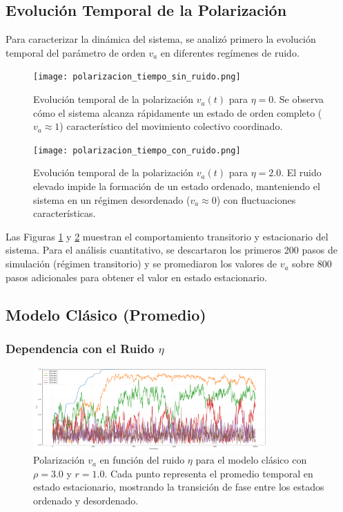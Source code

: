\documentclass{article}
\begin{document}
\subsection{Evolución Temporal de la Polarización}
Para caracterizar la dinámica del sistema, se analizó primero la evolución temporal del parámetro de orden $v_a$ en diferentes regímenes de ruido.

\begin{figure}[H]
\centering
\texttt{[image: polarizacion\_tiempo\_sin\_ruido.png]}
\caption{Evolución temporal de la polarización $v_a(t)$ para $\eta = 0$. Se observa cómo el sistema alcanza rápidamente un estado de orden completo ($v_a \approx 1$) característico del movimiento colectivo coordinado.}
\label{fig:tiempo_sin_ruido}
\end{figure}

\begin{figure}[H]
\centering
\texttt{[image: polarizacion\_tiempo\_con\_ruido.png]}
\caption{Evolución temporal de la polarización $v_a(t)$ para $\eta = 2.0$. El ruido elevado impide la formación de un estado ordenado, manteniendo el sistema en un régimen desordenado ($v_a \approx 0$) con fluctuaciones características.}
\label{fig:tiempo_con_ruido}
\end{figure}

Las Figuras \ref{fig:tiempo_sin_ruido} y \ref{fig:tiempo_con_ruido} muestran el comportamiento transitorio y estacionario del sistema. Para el análisis cuantitativo, se descartaron los primeros 200 pasos de simulación (régimen transitorio) y se promediaron los valores de $v_a$ sobre 800 pasos adicionales para obtener el valor en estado estacionario.

\subsection{Modelo Clásico (Promedio)}

\subsubsection{Dependencia con el Ruido $\eta$}
\begin{figure}[H]
\centering
\includegraphics[width=0.8\textwidth]{polarizacion_vs_ruido_promedio.png}
\caption{Polarización $v_a$ en función del ruido $\eta$ para el modelo clásico con $\rho = 3.0$ y $r = 1.0$. Cada punto representa el promedio temporal en estado estacionario, mostrando la transición de fase entre los estados ordenado y desordenado.}
\label{fig:va_vs_eta_promedio}
\end{figure}
\end{document}
